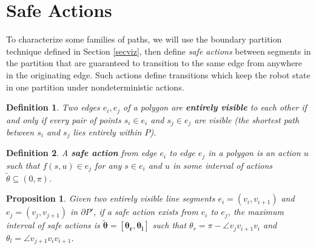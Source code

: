 \documentclass[]{article}
\newtheorem{proposition}{Proposition}
\newtheorem{definition}{Definition}
\begin{document}
\section{Safe Actions} \label{sec:safe}

To characterize some families of paths, we will use the boundary
partition technique defined in Section \ref{secviz}, then define
\emph{safe actions} between segments in the partition that are
guaranteed to transition to the same edge from anywhere in the
originating edge. Such actions define transitions which keep the
robot state in one partition under nondeterministic actions.

\begin{definition}
Two edges $e_i,e_j$ of a polygon are \textbf{entirely visible} to each other if
and only if every pair of points $s_i \in e_i$ and $s_j \in e_j$ are visible (the
shortest path between $s_i$ and $s_j$ lies entirely within $P$).
\end{definition}

\begin{definition} \label{def:sa}
A \textbf{safe action} from edge $e_i$ to edge $e_j$ in a polygon is an 
action $u$ such
that $f(s,u) \in e_j$ for any $s \in e_i$ and $u$ in some interval of actions
$\tilde{\theta} \subseteq (0,\pi)$.
\end{definition}

\begin{proposition} \label{prop:saferange}
Given two entirely visible line segments $e_i = (v_i, v_{i+1})$ and $e_j =
(v_j, v_{j+1})$ in $\partial P'$, if a safe action
exists from $e_i$ to $e_j$, the maximum interval of safe actions is $\bm{\tilde{\theta} = [\theta_r, \theta_l]}$ such
that $\theta_r = \pi - \angle v_j v_{i+1} v_i$ and $\theta_l = \angle v_{j+1}
v_i v_{i+1}$.
\end{proposition}
\end{document}
